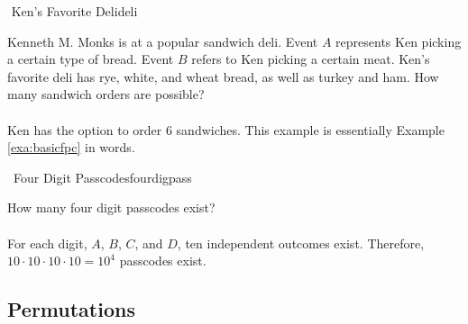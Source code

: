        \begin{example}{\Difficulty\,\,Ken's Favorite Deli}{deli}

            Kenneth M. Monks is at a popular sandwich deli. Event \(A\) represents Ken picking a certain type of bread. Event \(B\) refers to Ken picking a certain meat. Ken's favorite deli has rye, white, and wheat bread, as well as turkey and ham. How many sandwich orders are possible?
            \\
            \\
            Ken has the option to order \(6\) sandwiches. This example is essentially Example \ref{exa:basicfpc} in words.

        \end{example}
        \begin{example}{\Difficulty\,\Difficulty\,\,Four Digit Passcodes}{fourdigpass}

            How many four digit passcodes exist?
            \\
            \\
            For each digit, \(A\), \(B\), \(C\), and \(D\), ten independent outcomes exist. Therefore, \(10\cdot10\cdot10\cdot10=10^4\) passcodes exist.

        \end{example}

    \subsection{Permutations}

